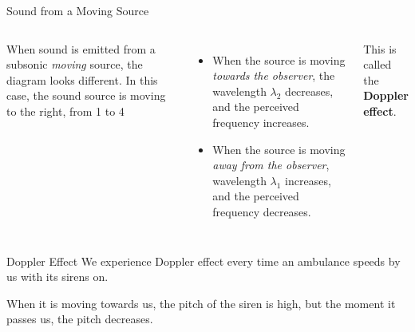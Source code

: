 \documentclass[12pt,compress,aspectratio=169]{beamer}
\begin{document}
\begin{frame}{Sound from a Moving Source}
  \vspace{.2in}
  \begin{columns}
      
    When sound is emitted from a subsonic \emph{moving} source, the diagram
    looks different. In this case, the sound source is moving to the right,
    from 1 to 4
    \begin{itemize}
    \item When the source is moving \emph{towards the observer}, the
      wavelength $\lambda_2$ decreases, and the perceived frequency increases.
    \item When the source is moving \emph{away from the observer}, wavelength
      $\lambda_1$ increases, and the perceived frequency decreases.
    \end{itemize}
    This is called the \textbf{Doppler effect}.
  \end{columns}
\end{frame}



\begin{frame}{Doppler Effect}
  We experience Doppler effect every time an ambulance speeds by us with its
  sirens on.
  \begin{center}
  \end{center}
  When it is moving towards us, the pitch of the siren is high, but
  the moment it passes us, the pitch decreases.
\end{frame}
\end{document}
